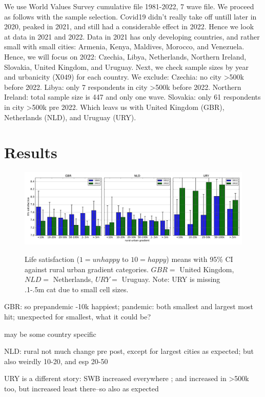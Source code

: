 \documentclass[10pt, letterpaper]{article}
\begin{document}
\begin{spacing}{1.4}
We use World Values Survey cumulative file 1981-2022, 7 wave file. We proceed as
follows with the sample selection. Covid19 didn't really take off untill later
in 2020, peaked in 2021, and still had a considerable effect in 2022. Hence we
look at data in 2021 and 2022. Data in 2021 has only developing countries, and
rather small with small cities: Armenia, Kenya, Maldives, Morocco, and
Venezuela. Hence, we will focus on 2022: Czechia, Libya, Netherlands, Northern
Ireland, Slovakia, United Kingdom, and Uruguay. Next, we check sample sizes by
year and urbanicity (X049) for each country. We exclude:  Czechia: no city >500k
before 2022. Libya: only 7 respondents in city >500k before 2022. Northern
Ireland: total sample size is 447 and only one wave. Slovakia: only 61
respondents in city >500k pre 2022. Which leavs us with United Kingdom (GBR),
Netherlands (NLD), and Uruguay (URY).

\section{Results}

\begin{figure}[H]
 \includegraphics[width=7in]{bar.pdf}\centering\label{bar}
\caption{Life satisfaction ($1=unhappy$ to $10=happy$) means with 95\% CI against rural urban gradient categories. $GBR=$ United Kingdom, $NLD=$ Netherlands, $URY=$ Uruguay. Note: URY is missing .1-.5m cat due to small cell sizes.}
 \end{figure}


GBR: so prepandemic -10k happiest; pandemic: both smallest and largest most hit; unexpected for smallest, what it could be?

may be some country specific


NLD: rural not much change pre post, except for largest cities as expected; but also weirdly 10-20, and esp 20-50


URY is a different story: SWB increased everywhere ; and increased in >500k too, but increased least there--so also as expected


\end{spacing}
\end{document}
